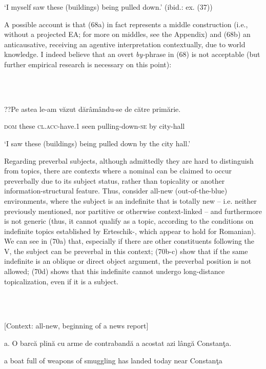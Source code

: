 \documentclass[output=paper]{langsci/langscibook}
\begin{document}
       ‘I myself saw these (buildings) being pulled down.’ (ibid.: ex. (37))

A possible account is that (68a) in fact represents a middle construction (i.e., without a projected EA; for more on middles, see the Appendix) and (68b) an anticausative, receiving an agentive interpretation contextually, due to world knowledge. I indeed believe that an overt \textit{by-}phrase in (68) is not acceptable (but further empirical research is necessary on this point):

\ea%
    \label{ex:key:69}
    \gll\\
        \\
    \glt
    \z

         ??Pe     astea le-am               văzut dărâmându-se      de către primărie. 

\textsc{dom} these \textsc{cl.acc-}have.1 seen  pulling-down-\textsc{se}  by          city-hall     

‘I saw these (buildings) being pulled down by the city hall.’   

Regarding preverbal subjects, although admittedly they are hard to distinguish from topics, there are contexts where a nominal can be claimed to occur preverbally due to its subject status, rather than topicality or another information-structural feature. Thus, consider all-new (out-of-the-blue) environments, where the subject is an indefinite that is totally new – i.e. neither previously mentioned, nor partitive or otherwise context-linked – and furthermore is not generic (thus, it cannot qualify as a topic, according to the conditions on indefinite topics established by Erteschik-\citealt{Shir2007}, which appear to hold for Romanian). We can see in (70a) that, especially if there are other constituents following the V, the subject can be preverbal in this context; (70b-c) show that if the same indefinite is an oblique or direct object argument, the preverbal position is not allowed; (70d) shows that this indefinite cannot undergo long-distance topicalization, even if it is a subject.

\ea%
    \label{ex:key:70}
    \gll\\
        \\
    \glt
    \z

          [Context: all-new, beginning of a news report]

a.    O barcă plină cu arme       de contrabandă a    acostat   azi    lângă Constanţa.

       a boat  full   of  weapons of smuggling     has landed  today near  Constanţa
\end{document}
